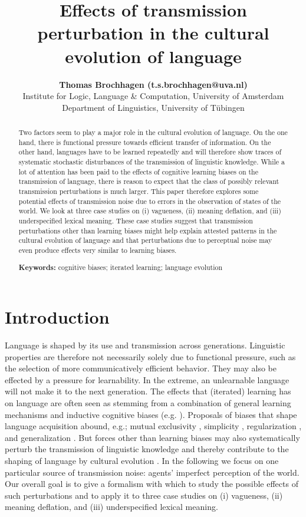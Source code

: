\documentclass[10pt,a4paper]{article}
\title{Effects of transmission perturbation in the cultural evolution of language}
\author{{\large \bf Thomas Brochhagen (t.s.brochhagen@uva.nl)}\\
  Institute for Logic, Language \& Computation, University of Amsterdam
  \AND {\large \bf Michael Franke (mchfranke@gmail.com)} \\
  Department of Linguistics, University of T\"{u}bingen}
\begin{document}
\maketitle

\begin{abstract}
  Two factors seem to play a major role in the cultural evolution of language. On the one hand,
  there is functional pressure towards efficient transfer of information. On the other hand,
  languages have to be learned repeatedly and will therefore show traces of systematic
  stochastic disturbances of the transmission of linguistic knowledge. While a lot of attention
  has been paid to the effects of cognitive learning biases on the transmission of language,
  there is reason to expect that the class of possibly relevant transmission perturbations is
  much larger. This paper therefore explores some potential effects of transmission noise due
  to errors in the observation of states of the world. We look at three case studies on (i)
  vagueness, (ii) meaning deflation, and (iii) underspecified lexical meaning. These case
  studies suggest that transmission perturbations other than learning biases might help explain
  attested patterns in the cultural evolution of language and that perturbations due to
  perceptual noise may even produce effects very similar to learning biases.

\textbf{Keywords:} 
cognitive biases; iterated learning; language evolution  
\end{abstract}


\section{Introduction}

Language is shaped by its use and transmission across generations. Linguistic properties are
therefore not necessarily solely due to functional pressure, such as the selection of more
communicatively efficient behavior. They may also be effected by a pressure for
learnability. In the extreme, an unlearnable language will not make it to the next
generation. The effects that (iterated) learning has on language are often seen as stemming
from a combination of general learning mechanisms and inductive cognitive biases
(e.g. \citealt{griffiths+kalish:2007,kirby+etal:2014,tamariz+kirby:2016}). Proposals of biases
that shape language acquisition abound, e.g.; mutual exclusivity
\citep{merriman+bowman:1989,clark:2009}, simplicity \citep{kirby+etal:2015}, regularization
\citep{hudson+etal:2005}, and generalization \citep{smith:2011}. But forces other than learning biases may also systematically perturb the transmission of
linguistic knowledge and thereby contribute to the shaping of language by
cultural evolution \citep[cf.][]{perfors+navarro:2014}.  In the following we focus on one particular source of transmission noise:
agents' imperfect perception of the world. Our overall goal is to give a
formalism with which to study the possible effects of such perturbations and to apply it to
three case studies on (i) vagueness, (ii) meaning deflation, and (iii) underspecified lexical
meaning.
\end{document}
